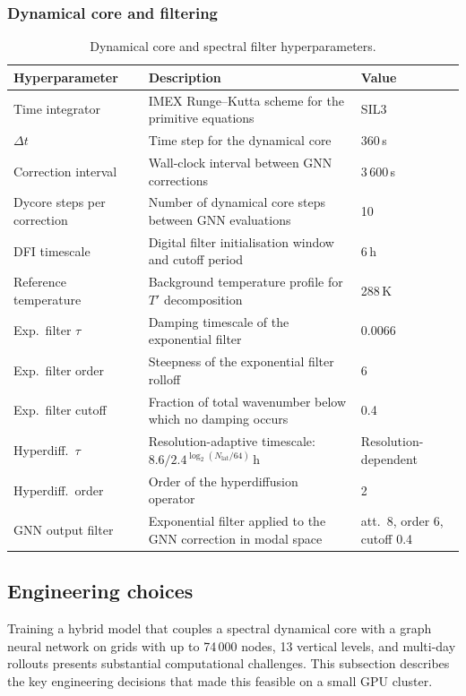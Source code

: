 \subsubsection{Dynamical core and filtering}

\begin{table}[htbp]
\centering
\small
\begin{tabular}{lp{6.4cm}l}
\hline
\textbf{Hyperparameter} & \textbf{Description} & \textbf{Value} \\
\hline\hline
Time integrator & IMEX Runge--Kutta scheme for the primitive equations & SIL3 \\
$\Delta t$ & Time step for the dynamical core & 360\,s \\
Correction interval & Wall-clock interval between GNN corrections & 3\,600\,s \\
Dycore steps per correction & Number of dynamical core steps between GNN evaluations & 10 \\
DFI timescale & Digital filter initialisation window and cutoff period & 6\,h \\
Reference temperature & Background temperature profile for $T'$ decomposition & 288\,K \\
\hline
Exp.\ filter $\tau$ & Damping timescale of the exponential filter & 0.0066 \\
Exp.\ filter order & Steepness of the exponential filter rolloff & 6 \\
Exp.\ filter cutoff & Fraction of total wavenumber below which no damping occurs & 0.4 \\
Hyperdiff.\ $\tau$ & Resolution-adaptive timescale: $8.6 / 2.4^{\log_2(N_\text{lat}/64)}$\,h & Resolution-dependent \\
Hyperdiff.\ order & Order of the hyperdiffusion operator & 2 \\
GNN output filter & Exponential filter applied to the GNN correction in modal space & att.\ 8, order 6, cutoff 0.4 \\
\hline
\end{tabular}
\caption{Dynamical core and spectral filter hyperparameters.}
\label{tab:hyperparams_filter}
\end{table}

\subsection{Engineering choices}
\label{sec:engineering}

Training a hybrid model that couples a spectral dynamical core with a graph neural network on grids with up to 74\,000 nodes, 13 vertical levels, and multi-day rollouts presents substantial computational challenges.
This subsection describes the key engineering decisions that made this feasible on a small GPU cluster.

